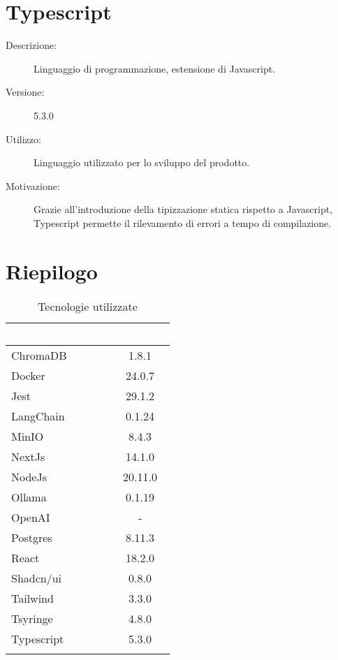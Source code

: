 \section{Typescript}
\begin{description}
\item[Descrizione:] Linguaggio di programmazione, estensione di Javascript.
\item[Versione:] 5.3.0
\item[Utilizzo:] Linguaggio utilizzato per lo sviluppo del prodotto.
\item[Motivazione:] Grazie all'introduzione della tipizzazione statica rispetto a Javascript, Typescript permette il rilevamento di errori a tempo di compilazione.
\end{description}

\section{Riepilogo} \label{sec:riepilogotech}

\begingroup
\setlength{\tabcolsep}{10pt}
\renewcommand{\arraystretch}{1.5}
\begin{xltabular}{0.5\textwidth}{| X | c |}
    \hline
     \textbf{\textcolor{white}{Nome tecnologia}} & \textbf{\textcolor{white}{Versione}} \\
    \hline
    \endhead
    ChromaDB & 1.8.1\\
    \hline
    Docker & 24.0.7\\
    \hline
    Jest & 29.1.2\\
    \hline
    LangChain & 0.1.24\\
    \hline
    MinIO & 8.4.3\\
    \hline
    NextJs & 14.1.0\\
    \hline
    NodeJs & 20.11.0\\
    \hline
    Ollama & 0.1.19\\
    \hline
    OpenAI & -\\
    \hline
    Postgres & 8.11.3\\
    \hline
    React & 18.2.0\\
    \hline
    Shadcn/ui & 0.8.0\\
    \hline
    Tailwind & 3.3.0\\
    \hline
    Tsyringe & 4.8.0\\
    \hline
    Typescript & 5.3.0\\
    \hline
     \caption{Tecnologie utilizzate}
    \label{tab:reqimp}
\end{xltabular}
\endgroup